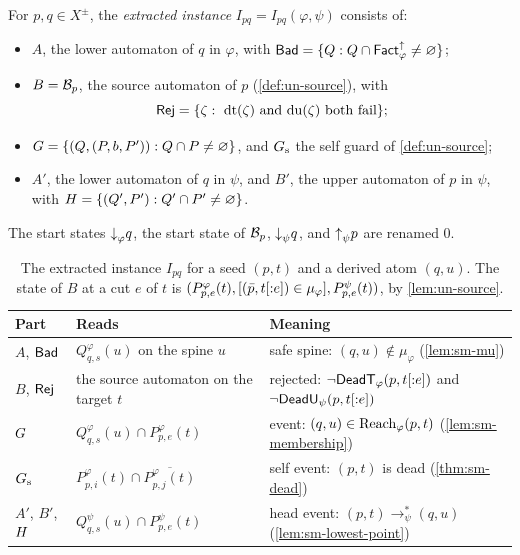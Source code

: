 \begin{definition}\label{def:ex-instance}
For $p,q\in X^\pm$, the \emph{extracted instance}
$I_{pq}=I_{pq}(\varphi,\psi)$ consists of:
\begin{itemize}[leftmargin=*]
\item $A$, the lower automaton of $q$ in $\varphi$, with
  $\mathsf{Bad}=\{Q:Q\cap\mathsf{Fact}^{\uparrow}_{\varphi}\ne\varnothing\}$;
\item $B=\mathcal B_p$, the source automaton of $p$ (\cref{def:un-source}), with
  \[
   \mathsf{Rej}=\{\zeta:\ \mathrm{dt}(\zeta)\text{ and }\mathrm{du}(\zeta)\text{ both
   fail}\};
  \]
\item $G=\{(Q,(P,b,P')):Q\cap P\ne\varnothing\}$, and $G_{\mathrm{s}}$ the self
  guard of \cref{def:un-source};
\item $A'$, the lower automaton of $q$ in $\psi$, and $B'$, the upper
  automaton of $p$ in $\psi$, with $H=\{(Q',P'):Q'\cap P'\ne\varnothing\}$.
\end{itemize}
The start states $\mathord{\downarrow}_{\varphi} q$, the start state of $\mathcal B_p$,
$\mathord{\downarrow}_{\psi} q$, and $\mathord{\uparrow}_{\psi} p$ are renamed $0$.
\end{definition}

\begin{table}[tbp]
\caption{The extracted instance $I_{pq}$ for a seed $(p,t)$ and a derived atom
$(q,u)$. The state of $B$ at a cut $e$ of $t$ is
$(P^\varphi_{p,e}(t),[(\bar p,t[{:}e])\in\mu_\varphi],P^\psi_{p,e}(t))$, by
\cref{lem:un-source}.}
\label{tab:ex-instance}
\centering
\small
\begin{tabular}{@{}lll@{}}
\toprule
Part & Reads & Meaning\\
\midrule
$A$, $\mathsf{Bad}$ & $Q^\varphi_{q,s}(u)$ on the spine $u$ &
  safe spine: $(q,u)\notin\mu_\varphi$ (\cref{lem:sm-mu})\\
$B$, $\mathsf{Rej}$ & the source automaton on the target $t$ &
  rejected: $\neg\mathsf{DeadT}_\varphi(p,t[{:}e])$ and $\neg\mathsf{DeadU}_\psi(p,t[{:}e])$\\
$G$ & $Q^\varphi_{q,s}(u)\cap P^\varphi_{p,e}(t)$ &
  event: $(q,u)\in \operatorname{Reach}_\varphi(p,t)$ (\cref{lem:sm-membership})\\
$G_{\mathrm{s}}$ & $P^\varphi_{p,i}(t)\cap\overline{P^\varphi_{p,j}(t)}$ &
  self event: $(p,t)$ is dead (\cref{thm:sm-dead})\\
$A'$, $B'$, $H$ & $Q^\psi_{q,s}(u)\cap P^\psi_{p,e}(t)$ &
  head event: $(p,t)\to^*_\psi(q,u)$ (\cref{lem:sm-lowest-point})\\
\bottomrule
\end{tabular}
\end{table}

